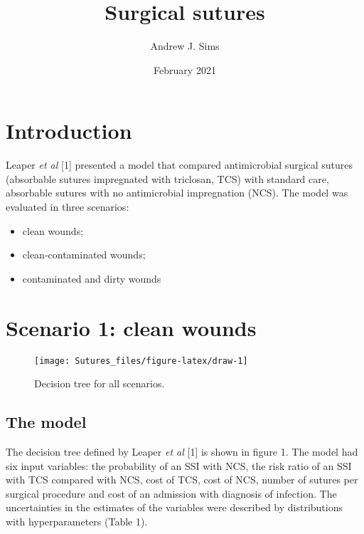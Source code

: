 \documentclass[
]{article}
\title{Surgical sutures}
\author{Andrew J. Sims}
\date{February 2021}
\providecommand{\tightlist}{%
  \setlength{\itemsep}{0pt}\setlength{\parskip}{0pt}}
\begin{document}
\maketitle

\hypertarget{introduction}{%
\section{Introduction}\label{introduction}}

Leaper \emph{et al} {[}1{]} presented a model that compared
antimicrobial surgical sutures (absorbable sutures impregnated with
triclosan, TCS) with standard care, absorbable sutures with no
antimicrobial impregnation (NCS). The model was evaluated in three
scenarios:

\begin{itemize}
\tightlist
\item
  clean wounds;
\item
  clean-contaminated wounds;
\item
  contaminated and dirty wounds
\end{itemize}

\hypertarget{scenario-1-clean-wounds}{%
\section{Scenario 1: clean wounds}\label{scenario-1-clean-wounds}}

\begin{figure}

{\centering \texttt{[image: Sutures\_files/figure-latex/draw-1]} 

}

\caption{Decision tree for all scenarios.}\label{fig:draw}
\end{figure}

\hypertarget{the-model}{%
\subsection{The model}\label{the-model}}

The decision tree defined by Leaper \emph{et al} {[}1{]} is shown in
figure 1. The model had six input variables: the probability of an SSI
with NCS, the risk ratio of an SSI with TCS compared with NCS, cost of
TCS, cost of NCS, number of sutures per surgical procedure and cost of
an admission with diagnosis of infection. The uncertainties in the
estimates of the variables were described by distributions with
hyperparameters (Table 1).
\end{document}
